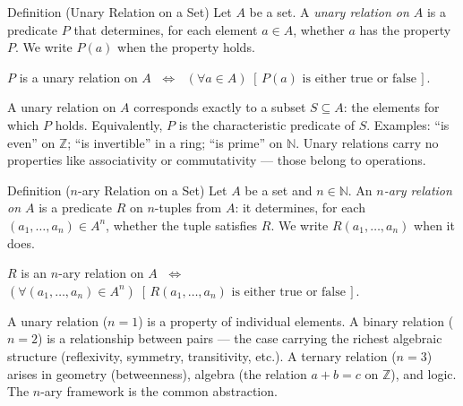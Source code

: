 
\begin{definitionbox}{Definition (Unary Relation on a Set)}
\label{def:unary-relation}
Let $A$ be a set.
A \emph{unary relation on $A$} is a predicate $P$ that determines,
for each element $a \in A$, whether $a$ has the property $P$.
We write $P(a)$ when the property holds.
\end{definitionbox}

\begin{remark}
$P$ is a unary relation on $A$
$\;\iff\;$
$(\forall a \in A)\;[\,P(a) \text{ is either true or false}\,]$.
\end{remark}

\begin{remark}
A unary relation on $A$ corresponds exactly to a subset $S \subseteq A$:
the elements for which $P$ holds.
Equivalently, $P$ is the characteristic predicate of $S$.
Examples: ``is even'' on $\mathbb{Z}$; ``is invertible'' in a ring;
``is prime'' on $\mathbb{N}$.
Unary relations carry no properties like associativity or commutativity —
those belong to operations.
\end{remark}


\begin{definitionbox}{Definition ($n$-ary Relation on a Set)}
\label{def:nary-relation}
Let $A$ be a set and $n \in \mathbb{N}$.
An \emph{$n$-ary relation on $A$} is a predicate $R$ on $n$-tuples from $A$:
it determines, for each $(a_1, \ldots, a_n) \in A^n$, whether the tuple
satisfies $R$.
We write $R(a_1, \ldots, a_n)$ when it does.
\end{definitionbox}

\begin{remark}
$R$ is an $n$-ary relation on $A$
$\;\iff\;$
$(\forall (a_1, \ldots, a_n) \in A^n)\;
[\,R(a_1, \ldots, a_n) \text{ is either true or false}\,]$.
\end{remark}

\begin{remark}
A unary relation ($n = 1$) is a property of individual elements.
A binary relation ($n = 2$) is a relationship between pairs — the case
carrying the richest algebraic structure (reflexivity, symmetry, transitivity, etc.).
A ternary relation ($n = 3$) arises in geometry (betweenness), algebra
(the relation $a + b = c$ on $\mathbb{Z}$), and logic.
The $n$-ary framework is the common abstraction.
\end{remark}

